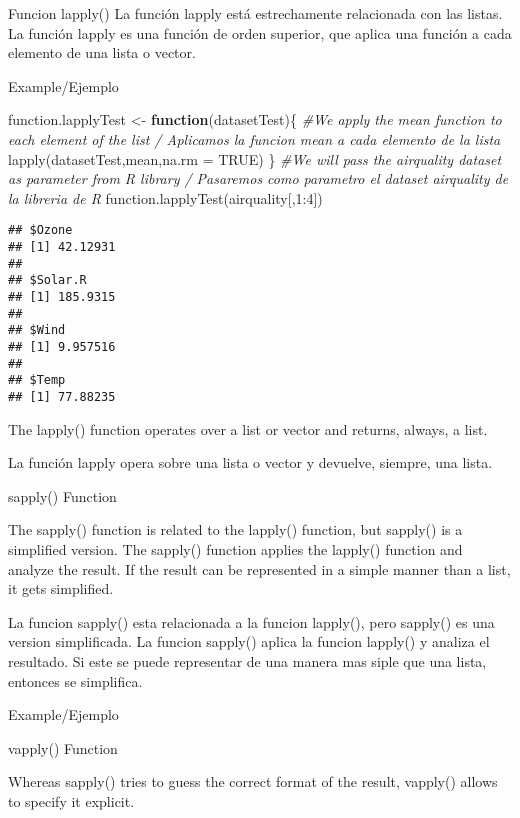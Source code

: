 \documentclass[
]{article}
\newenvironment{Shaded}{\begin{snugshade}}{\end{snugshade}}
\newcommand{\AttributeTok}[1]{\textcolor[rgb]{0.77,0.63,0.00}{#1}}
\newcommand{\CommentTok}[1]{\textcolor[rgb]{0.56,0.35,0.01}{\textit{#1}}}
\newcommand{\ConstantTok}[1]{\textcolor[rgb]{0.00,0.00,0.00}{#1}}
\newcommand{\ControlFlowTok}[1]{\textcolor[rgb]{0.13,0.29,0.53}{\textbf{#1}}}
\newcommand{\DecValTok}[1]{\textcolor[rgb]{0.00,0.00,0.81}{#1}}
\newcommand{\FunctionTok}[1]{\textcolor[rgb]{0.00,0.00,0.00}{#1}}
\newcommand{\NormalTok}[1]{#1}
\newcommand{\OtherTok}[1]{\textcolor[rgb]{0.56,0.35,0.01}{#1}}
\newcommand{\SpecialCharTok}[1]{\textcolor[rgb]{0.00,0.00,0.00}{#1}}
\begin{document}
Funcion lapply() La función lapply está estrechamente relacionada con
las listas. La función lapply es una función de orden superior, que
aplica una función a cada elemento de una lista o vector.

Example/Ejemplo

\begin{Shaded}
\begin{Highlighting}[]
\NormalTok{function.lapplyTest }\OtherTok{\textless{}{-}} \ControlFlowTok{function}\NormalTok{(datasetTest)\{}
  \CommentTok{\#We apply the mean function to each element of the list / Aplicamos la funcion mean a cada elemento de la lista}
  \FunctionTok{lapply}\NormalTok{(datasetTest,mean,}\AttributeTok{na.rm =} \ConstantTok{TRUE}\NormalTok{)}
\NormalTok{\}}
\CommentTok{\#We will pass the airquality dataset as parameter from R library / Pasaremos como parametro el dataset airquality de la libreria de R}
\FunctionTok{function.lapplyTest}\NormalTok{(airquality[,}\DecValTok{1}\SpecialCharTok{:}\DecValTok{4}\NormalTok{])}
\end{Highlighting}
\end{Shaded}

\begin{verbatim}
## $Ozone
## [1] 42.12931
## 
## $Solar.R
## [1] 185.9315
## 
## $Wind
## [1] 9.957516
## 
## $Temp
## [1] 77.88235
\end{verbatim}

The lapply() function operates over a list or vector and returns,
always, a list.

La función lapply opera sobre una lista o vector y devuelve, siempre,
una lista.

sapply() Function

The sapply() function is related to the lapply() function, but sapply()
is a simplified version. The sapply() function applies the lapply()
function and analyze the result. If the result can be represented in a
simple manner than a list, it gets simplified.

La funcion sapply() esta relacionada a la funcion lapply(), pero
sapply() es una version simplificada. La funcion sapply() aplica la
funcion lapply() y analiza el resultado. Si este se puede representar de
una manera mas siple que una lista, entonces se simplifica.

Example/Ejemplo

vapply() Function

Whereas sapply() tries to guess the correct format of the result,
vapply() allows to specify it explicit.
\end{document}
